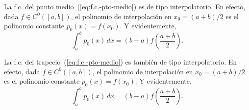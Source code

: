\begin{example}
  \label{ex:formula-pto-medio-interpol}
  La f.c. del punto medio~(\ref{eq:f.c.-pto-medio}) es de tipo
  interpolatorio. En efecto, dada $f\in C^0([a,b])$, el polinomio de
  interpolación en $x_0=(a+b)/2$ es el polinomio constante
  $p_0(x)=f(x_0)$. Y evidentemente,
  \begin{equation*}
    \int_a^b p_0(x)\,dx = (b-a)f\left(\frac{a+b}{2}\right).
  \end{equation*}
\end{example}

\begin{example}
  \label{ex:formula-trapecio-interpol}
  La f.c. del trapecio~(\ref{eq:f.c.-pto-medio}) es también de tipo
  interpolatorio. En efecto, dada $f\in C^0([a,b])$, el polinomio de
  interpolación en $x_0=(a+b)/2$ es el polinomio constante
  $p_0(x)=f(x_0)$. Y evidentemente,
  \begin{equation*}
    \int_a^b p_0(x)\,dx = (b-a)f\left(\frac{a+b}{2}\right).
  \end{equation*}
  
\end{example}
